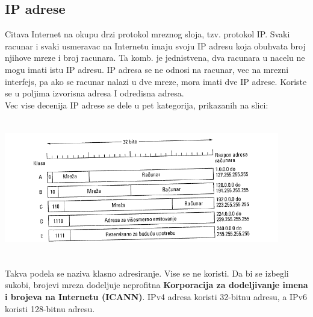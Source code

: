 \documentclass{article} %
\begin{document}
\subsection{IP adrese}
Citava Internet na okupu drzi protokol mreznog sloja, tzv. protokol IP.
Svaki racunar i svaki usmeravac na Internetu imaju svoju IP adresu koja obuhvata broj njihove mreze i broj racunara. Ta komb. je jednistvena, dva racunara u nacelu ne mogu imati istu IP adresu. IP adresa se ne odnosi na racunar,  vec na mrezni interfejs, pa ako se racunar nalazi u dve mreze, mora imati dve IP adrese. Koriste se u poljima izvorisna adresa I odredisna adresa. \\

Vec vise decenija IP adrese se dele u pet kategorija, prikazanih na slici:
 \begin{center}
\includegraphics[width=12cm, height=6cm]{klasnoAdr}\\
\end{center}
 Takva podela se naziva klasno adresiranje. Vise se ne koristi. Da bi se izbegli sukobi, brojevi mreza dodeljuje neprofitna \textbf{Korporacija za dodeljivanje imena i brojeva na Internetu (ICANN)}.
IPv4 adresa koristi 32-bitnu adresu, a  IPv6 koristi 128-bitnu adresu.\\
\end{document}

